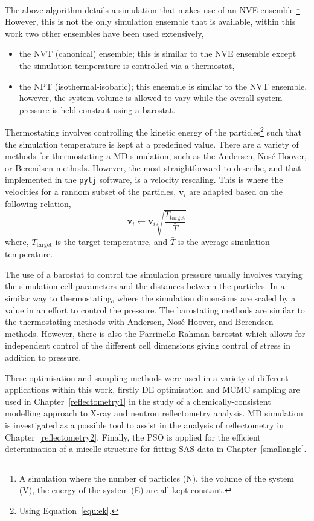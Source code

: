 The above algorithm details a simulation that makes use of an NVE ensemble.\footnote{A simulation where the number of particles (N), the volume of the system (V), the energy of the system (E) are all kept constant.}
However, this is not the only simulation ensemble that is available, within this work two other ensembles have been used extensively,
%
\begin{itemize}
\item the NVT (canonical) ensemble; this is similar to the NVE ensemble except the simulation temperature is controlled via a thermostat,
\item the NPT (isothermal-isobaric); this ensemble is similar to the NVT ensemble, however, the system volume is allowed to vary while the overall system pressure is held constant using a barostat.
\end{itemize}
%
Thermostating involves controlling the kinetic energy of the particles\footnote{Using Equation~\ref{equ:ek}.} such that the simulation temperature is kept at a predefined value.
There are a variety of methods for thermostating a MD simulation, such as the Andersen, Nos\'{e}-Hoover, or Berendsen methods.\autocite{andersen_molecular_1980,nose_unified_1984,berendsen_molecular_1984,hoover_canonical_1985}
However, the most straightforward to describe, and that implemented in the \texttt{pylj} software, is a velocity rescaling.\autocite{bussi_canonical_2007}
This is where the velocities for a random subset of the particles, $\mathbf{v}_i$ are adapted based on the following relation,
%
\begin{equation}
\mathbf{v}_i \leftarrow \mathbf{v}_i \sqrt{\frac{T_{\text{target}}}{\bar{T}}}
\end{equation}
%
where, $T_{\text{target}}$ is the target temperature, and $\bar{T}$ is the average simulation temperature.

The use of a barostat to control the simulation pressure usually involves varying the simulation cell parameters and the distances between the particles.
In a similar way to thermostating, where the simulation dimensions are scaled by a value in an effort to control the pressure.
The barostating methods are similar to the thermostating methods with Andersen, Nos\'{e}-Hoover, and Berendsen methods.
However, there is also the Parrinello-Rahman barostat which allows for independent control of the different cell dimensions giving control of stress in addition to pressure.\autocite{parrinello_polymorphic_1981}

These optimisation and sampling methods were used in a variety of different applications within this work, firstly DE optimisation and MCMC sampling are used in Chapter~\ref{reflectometry1} in the study of a chemically-consistent modelling approach to X-ray and neutron reflectometry analysis.
MD simulation is investigated as a possible tool to assist in the analysis of reflectometry in Chapter~\ref{reflectometry2}.
Finally, the PSO is applied for the efficient determination of a micelle structure for fitting SAS data in Chapter~\ref{smallangle}.
